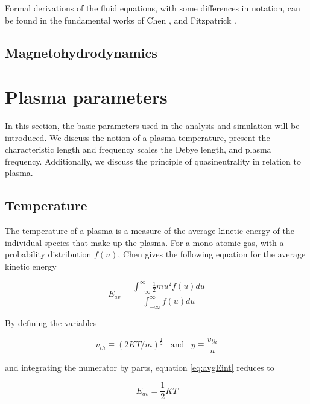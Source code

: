Formal derivations of the fluid equations, with some differences in notation, can be found in the fundamental works of Chen , and Fitzpatrick .

\subsection{Magnetohydrodynamics}

\section{Plasma parameters}\label{subsec:pParam}
In this section, the basic parameters used in the analysis and simulation will be introduced. We discuss the notion of a plasma temperature, present the characteristic length and frequency scales the Debye length, and plasma frequency. Additionally, we discuss the principle of quasineutrality in relation to plasma. 

\subsection{Temperature}\label{subsec:temperature}
The temperature of a plasma is a measure of the average kinetic energy of the individual species that make up the plasma. For a mono-atomic gas, with a probability distribution $f(u)$, Chen  gives the following equation for the average kinetic energy

\begin{equation}\label{eq:avgEint}
    E_{av} = \frac{\int^\infty_{-\infty} \frac{1}{2} m u^2 f(u) du}{\int^\infty_{-\infty} f(u) du}
\end{equation}


By defining the variables 

\begin{equation*}
    v_{th} \equiv (2 K T / m)^{\frac{1}{2}} \hspace{10pt} \text{and} \hspace{10pt} y \equiv \frac{v_{th}}{u}
\end{equation*}
    
and integrating the numerator by parts, equation \ref{eq:avgEint} reduces to

\begin{equation}\label{eq:avgE1D}
    E_{av} = \frac{1}{2} K T
\end{equation}

